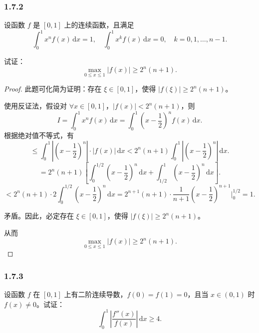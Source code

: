 \documentclass[12pt]{ctexart}
\begin{document}
\subsubsection*{1.7.2}

设函数 $f$ 是 $[0, 1]$ 上的连续函数，且满足
\[
\int_{0}^{1} x^n f(x) \, \mathrm{d}x = 1, \quad \int_{0}^{1} x^k f(x) \, \mathrm{d}x = 0, \quad k = 0, 1, \dots, n-1.
\]

试证：
\[
\max_{0 \leq x \leq 1} |f(x)| \geq 2^n (n + 1).
\]

\begin{proof}
此题可化简为证明：存在 $\xi \in [0, 1]$，使得 $|f(\xi)| \geq 2^n(n+1)$。

使用反证法，假设对 $\forall x \in [0, 1]$，$|f(x)| < 2^n(n+1)$，则
\[
I = \int_{0}^{1} x^n f(x) \, \mathrm{d}x = \int_{0}^{1} (x - \frac{1}{2})^n f(x) \, \mathrm{d}x.
\]
根据绝对值不等式，有
\[
\leq \int_{0}^{1} |(x - \frac{1}{2})^n| \cdot |f(x)| \, \mathrm{d}x < 2^n(n+1) \int_{0}^{1} |(x - \frac{1}{2})^n| \, \mathrm{d}x.
\]
\[
= 2^n(n+1) \left[\int_{0}^{1/2} (x - \frac{1}{2})^n \, \mathrm{d}x + \int_{1/2}^{1} (x - \frac{1}{2})^n \, \mathrm{d}x \right].
\]
\[
< 2^n(n+1) \cdot 2 \int_{0}^{1/2} (x - \frac{1}{2})^n \, \mathrm{d}x = 2^{n+1}(n+1) \cdot \frac{1}{n+1} (x - \frac{1}{2})^{n+1} \bigg|_{0}^{1/2} = 1.
\]

矛盾。因此，必定存在 $\xi \in [0, 1]$，使得 $|f(\xi)| \geq 2^n(n+1)$。

从而
\[
\max_{0 \leq x \leq 1} |f(x)| \geq 2^n(n+1).
\]
\end{proof}

\subsubsection*{1.7.3}

设函数 $f$ 在 $[0, 1]$ 上有二阶连续导数，$f(0) = f(1) = 0$，且当 $x \in (0, 1)$ 时 $f(x) \neq 0$。试证：
\[
\int_{0}^{1} \left| \frac{f''(x)}{f(x)} \right| \, \mathrm{d}x \geq 4.
\]
\end{document}
